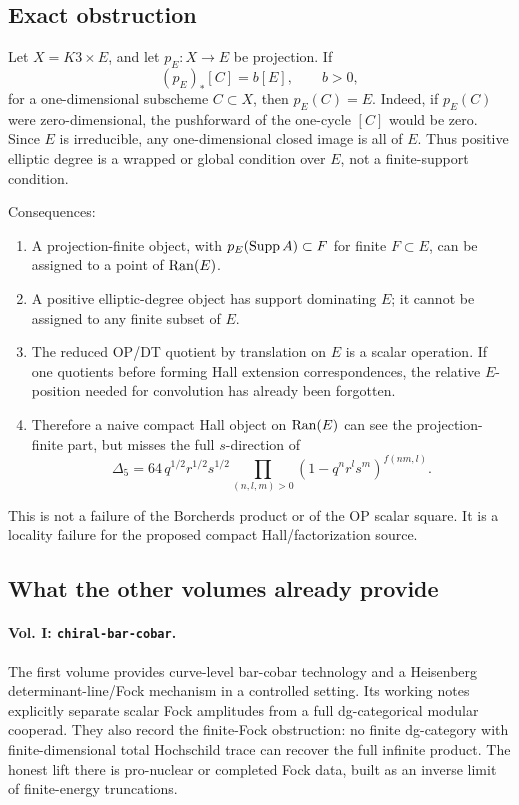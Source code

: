\subsection{Exact obstruction}

Let \(X=K3\times E\), and let \(p_E:X\to E\) be projection.  If
\[
(p_E)_*[C]=b[E],\qquad b>0,
\]
for a one-dimensional subscheme \(C\subset X\), then \(p_E(C)=E\).
Indeed, if \(p_E(C)\) were zero-dimensional, the pushforward of the
one-cycle \([C]\) would be zero.  Since \(E\) is irreducible, any
one-dimensional closed image is all of \(E\).  Thus positive elliptic
degree is a wrapped or global condition over \(E\), not a finite-support
condition.

Consequences:
\begin{enumerate}
\item A projection-finite object, with \(p_E(\operatorname{Supp} A)\subset F\) for
finite \(F\subset E\), can be assigned to a point of \(\operatorname{Ran}(E)\).
\item A positive elliptic-degree object has support dominating \(E\);
it cannot be assigned to any finite subset of \(E\).
\item The reduced OP/DT quotient by translation on \(E\) is a scalar
operation.  If one quotients before forming Hall extension
correspondences, the relative \(E\)-position needed for convolution has
already been forgotten.
\item Therefore a naive compact Hall object on \(\operatorname{Ran}(E)\) can see the
projection-finite part, but misses the full \(s\)-direction of
\[
\Delta_5
=64\,q^{1/2}r^{1/2}s^{1/2}
\prod_{(n,l,m)>0}(1-q^n r^l s^m)^{f(nm,l)}.
\]
\end{enumerate}

This is not a failure of the Borcherds product or of the OP scalar
square.  It is a locality failure for the proposed compact
Hall/factorization source.

\subsection{What the other volumes already provide}

\paragraph{Vol. I: \texttt{chiral-bar-cobar}.}
The first volume provides curve-level bar-cobar technology and a
Heisenberg determinant-line/Fock mechanism in a controlled setting.  Its
working notes explicitly separate scalar Fock amplitudes from a full
dg-categorical modular cooperad.  They also record the finite-Fock
obstruction: no finite dg-category with finite-dimensional total
Hochschild trace can recover the full infinite product.  The honest lift
there is pro-nuclear or completed Fock data, built as an inverse limit of
finite-energy truncations.

